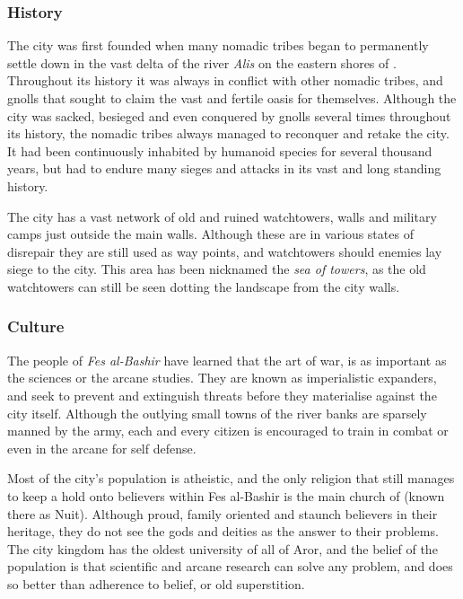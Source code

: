 \subsubsection{History}

The city was first founded when many nomadic tribes began to permanently
settle down in the vast delta of the river \emph{Alis} on the eastern shores
of . Throughout its history it was always in conflict with
other nomadic tribes, and gnolls that sought to claim the vast and fertile
oasis for themselves. Although the city was sacked, besieged and even
conquered by gnolls several times throughout its history, the nomadic tribes
always managed to reconquer and retake the city. It had been continuously
inhabited by humanoid species for several thousand years, but had to endure
many sieges and attacks in its vast and long standing history.

The city has a vast network of old and ruined watchtowers, walls and military
camps just outside the main walls. Although these are in various states of
disrepair they are still used as way points, and watchtowers should enemies
lay siege to the city. This area has been nicknamed the \emph{sea of towers},
as the old watchtowers can still be seen dotting the landscape from the city
walls.

\subsubsection{Culture}

The people of \emph{Fes al-Bashir} have learned that the art of war, is as
important as the sciences or the arcane studies. They are known as
imperialistic expanders, and seek to prevent and extinguish threats before
they materialise against the city itself. Although the outlying small towns of
the river banks are sparsely manned by the army, each and every citizen is
encouraged to train in combat or even in the arcane for self defense.

Most of the city's population is atheistic, and the only religion that still
manages to keep a hold onto believers within Fes al-Bashir is the main church
of  (known there as Nuit). Although proud, family oriented
and staunch believers in their heritage, they do not see the gods and deities
as the answer to their problems. The city kingdom has the oldest university of
all of Aror, and the belief of the population is that scientific and arcane
research can solve any problem, and does so better than adherence to belief,
or old superstition.

